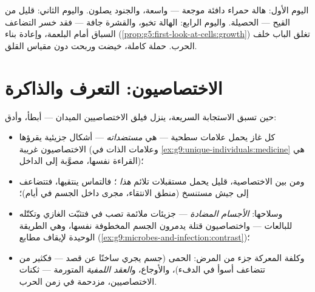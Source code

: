 \begin{example}\label{ex:g9:immune-defenses:cut}
اليوم الأول: هالة حمراء دافئة موجعة ---  واسعة،
والجنود يصلون. واليوم الثاني: قليل من القيح --- الحصيلة.
واليوم الرابع: الهالة تخبو، والقشرة جافة --- فقد خسر
التضاعف السباق أمام البلعمة، وإعادة بناء 
(\cref{prop:g5:first-look-at-cells:growth}) تغلق الباب
خلف الحرب. حملة كاملة، خيضت وربحت دون مقياس القلق.
\end{example}

\section{الاختصاصيون: التعرف والذاكرة}

\begin{proposition}\label{prop:g9:immune-defenses:specific}
حين تسبق الاستجابة السريعة، ينزل فيلق الاختصاصيين
الميدان --- أبطأ، وأدق:
\begin{itemize}
  \item كل غاز يحمل علامات سطحية --- هي
        \emph{مستضداته} --- أشكال جزيئية
        يقرؤها الاختصاصيون غريبة (وعلامات الذات في
        \cref{ex:g9:unique-individuals:medicine} هي
        القراءة نفسها، مصوَّبة إلى الداخل)؛
  \item ومن بين  الاختصاصية، قليل يحمل
        مستقبلات تلائم \emph{هذا} ؛ فالتماس
        ينتقيها، فتتضاعف إلى جيش مستنسخ (منطق الانتقاء،
        مجرى داخل الجسم في أيام)؛
  \item وسلاحها: \emph{الأجسام المضادة}
        --- جزيئات ملائمة تصب في  فتثبّت الغازي
        وتكتّله للبالعات --- واختصاصيون قتلة يدمرون
         الجسم المخطوفة نفسها، وهي الطريقة الوحيدة
        لإيقاف مطابع 
        (\cref{ex:g9:microbes-and-infection:contrast})؛
  \item وكلفة المعركة جزء من المرض: الحمى (جسم يجري
        ساخنًا عن قصد --- فكثير من  تتضاعف أسوأ
        في الدفء)، والأوجاع، و\emph{العقد اللمفية}
        المتورمة --- ثكنات الاختصاصيين، مزدحمة في زمن
        الحرب.
\end{itemize}
\end{proposition}
\admitted

